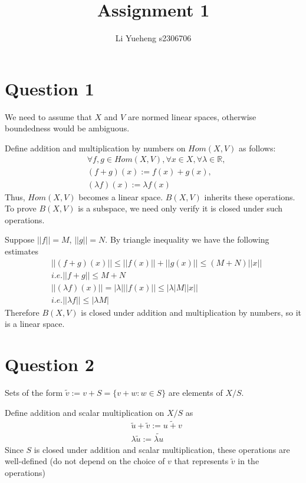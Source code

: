 \documentclass{article}
\begin{document}
\title{Assignment 1}
\author{Li Yueheng s2306706}

\maketitle

\section*{Question 1}
We need to assume that $X$ and $V$ are normed linear spaces, otherwise boundedness would be ambiguous.

Define addition and multiplication by numbers on $Hom(X,V)$ as follows:
\begin{align*}
	&\forall f,g\in Hom(X,V), \forall x\in X, \forall \lambda \in \mathbb{R}, \\
	&(f+g)(x):=f(x)+g(x),\\
	&(\lambda f)(x):=\lambda f(x)
\end{align*}
Thus, $Hom(X,V)$ becomes a linear space. $B(X,V)$ inherits these operations. To prove $B(X,V)$ is a subspace, we need only verify it is closed under such operations.

Suppose $||f||=M$, $||g||=N$. By triangle inequality we have the following estimates
\begin{align*}
	&||(f+g)(x)||\leq ||f(x)||+||g(x)||\leq (M+N)||x|| \\
	&i.e.||f+g||\leq M+N \\
	&||(\lambda f)(x)||=|\lambda|||f(x)||\leq |\lambda|M||x|| \\
	&i.e. ||\lambda f||\leq |\lambda M|
\end{align*}
Therefore $B(X,V)$ is closed under addition and multiplication by numbers, so it is a linear space.

\section*{Question 2}

Sets of the form $\widetilde{v}:=v+S=\{v+w:w\in S\}$
are elements of $X/S$.

Define addition and scalar multiplication on $X/S$ as
\begin{align*}
	&\widetilde{u}+\widetilde{v}:=\widetilde{u+v} \\
	&\lambda \widetilde{u}:=\widetilde{\lambda u}
\end{align*}
Since $S$ is closed under addition and scalar multiplication, these operations are well-defined (do not depend on the choice of $v$ that represents $\widetilde{v}$ in the operations)
\end{document}
